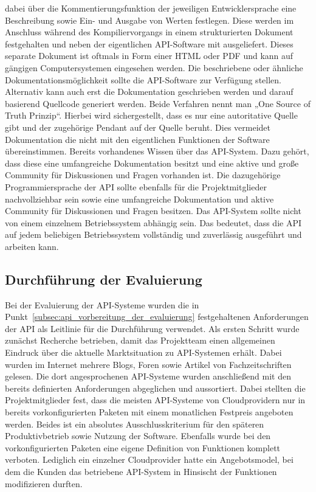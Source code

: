 \begin{outline}
  dabei über die Kommentierungsfunktion der jeweiligen Entwicklersprache eine
  Beschreibung sowie Ein- und Ausgabe von Werten festlegen. Diese werden im
  Anschluss während des Kompiliervorgangs in einem strukturierten Dokument
  festgehalten und neben der eigentlichen API-Software mit ausgeliefert. Dieses
  separate Dokument ist oftmals in Form einer HTML oder PDF und kann auf
  gängigen Computersystemen eingesehen werden. Die beschriebene oder ähnliche
  Dokumentationsmöglichkeit sollte die API-Software zur Verfügung stellen.
  Alternativ kann auch erst die Dokumentation geschrieben werden und darauf
  basierend Quellcode generiert werden. Beide Verfahren nennt man „One Source
  of Truth Prinzip“. Hierbei wird sichergestellt, dass es nur eine autoritative
  Quelle gibt und der zugehörige Pendant auf der Quelle beruht. Dies vermeidet
  Dokumentation die nicht mit den eigentlichen Funktionen der Software
  übereinstimmen.
  \1 Bereits vorhandenes Wissen über das API-System. Dazu gehört, dass diese
  eine umfangreiche Dokumentation besitzt und eine aktive und große Community
  für Diskussionen und Fragen vorhanden ist. Die dazugehörige
  Programmiersprache der API sollte ebenfalls für die Projektmitglieder
  nachvollziehbar sein sowie eine umfangreiche Dokumentation und aktive
  Community für Diskussionen und Fragen besitzen.
  \1 Das API-System sollte nicht von einem einzelnem Betriebssystem abhängig
  sein. Das bedeutet, dass die API auf jedem beliebigen Betriebssystem
  vollständig und zuverlässig ausgeführt und arbeiten kann.
\end{outline}
\nl%

\subsection{Durchführung der Evaluierung}
\label{subsec:api_durchfuehrung_der_evaluierung}
Bei der Evaluierung der API-Systeme wurden die in
Punkt~\ref{subsec:api_vorbereitung_der_evaluierung} festgehaltenen
Anforderungen der API als Leitlinie für die Durchführung verwendet. Als ersten
Schritt wurde zunächst Recherche betrieben, damit das Projektteam einen
allgemeinen Eindruck über die aktuelle Marktsituation zu API-Systemen erhält.
Dabei wurden im Internet mehrere Blogs, Foren sowie Artikel von
Fachzeitschriften gelesen. Die dort angesprochenen API-Systeme wurden
anschließend mit den bereits definierten Anforderungen abgeglichen und
aussortiert. Dabei stellten die Projektmitglieder fest, dass die meisten
API-Systeme von Cloudprovidern nur in bereits vorkonfigurierten Paketen mit
einem monatlichen Festpreis angeboten werden. Beides ist ein absolutes
Ausschlusskriterium für den späteren Produktivbetrieb sowie Nutzung der
Software. Ebenfalls wurde bei den vorkonfigurierten Paketen eine eigene
Definition von Funktionen komplett verboten. Lediglich ein einzelner
Cloudprovider hatte ein Angebotsmodel, bei dem die Kunden das betriebene
API-System in Hinsischt der Funktionen modifizieren durften.

